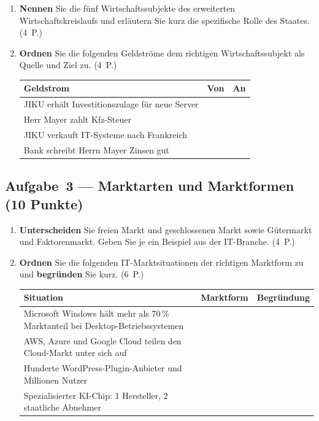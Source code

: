 \documentclass[11pt, a4paper]{article}
\begin{document}
\begin{enumerate}[label=(\alph*)]
  \item \textbf{Nennen} Sie die fünf Wirtschaftssubjekte des erweiterten Wirtschaftskreislaufs
  und erläutern Sie kurz die spezifische Rolle des Staates. \hfill (4~P.)

  \vspace{6cm}

  \item \textbf{Ordnen} Sie die folgenden Geldströme dem richtigen Wirtschaftssubjekt als
  Quelle und Ziel zu. \hfill (4~P.)

  \bigskip

  \noindent
  \begin{tabular}{|p{5.5cm}|p{2.5cm}|p{2.5cm}|}
  \hline
  \textbf{Geldstrom} & \textbf{Von} & \textbf{An}\\
  \hline
  JIKU erhält Investitionszulage für neue Server & & \\[0.8cm]
  \hline
  Herr Mayer zahlt Kfz-Steuer & & \\[0.8cm]
  \hline
  JIKU verkauft IT-Systeme nach Frankreich & & \\[0.8cm]
  \hline
  Bank schreibt Herrn Mayer Zinsen gut & & \\[0.8cm]
  \hline
  \end{tabular}
\end{enumerate}

\subsection*{Aufgabe~3 --- Marktarten und Marktformen (10 Punkte)}

\begin{enumerate}[label=(\alph*)]
  \item \textbf{Unterscheiden} Sie freien Markt und geschlossenen Markt sowie Gütermarkt
  und Faktorenmarkt. Geben Sie je ein Beispiel aus der IT-Branche. \hfill (4~P.)

  \vspace{6cm}

  \item \textbf{Ordnen} Sie die folgenden IT-Marktsituationen der richtigen Marktform zu
  und \textbf{begründen} Sie kurz. \hfill (6~P.)

  \bigskip

  \noindent
  \begin{tabular}{|p{6.5cm}|p{2.5cm}|p{3.5cm}|}
  \hline
  \textbf{Situation} & \textbf{Marktform} & \textbf{Begründung}\\
  \hline
  Microsoft Windows hält mehr als 70\,\% Marktanteil bei Desktop-Betriebssystemen & & \\[1.2cm]
  \hline
  AWS, Azure und Google Cloud teilen den Cloud-Markt unter sich auf & & \\[1.2cm]
  \hline
  Hunderte WordPress-Plugin-Anbieter und Millionen Nutzer & & \\[1.2cm]
  \hline
  Spezialisierter KI-Chip: 1 Hersteller, 2 staatliche Abnehmer & & \\[1.2cm]
  \hline
  \end{tabular}
\end{enumerate}
\end{document}
